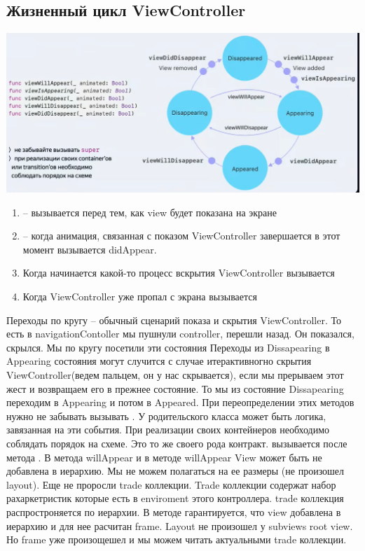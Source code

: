 \documentclass{article}
\begin{document}
    \subsection{Жизненный цикл ViewController}
    \includegraphics[scale = 0.4]{pic/Снимок экрана 2023-08-02 в 21.47.17.png}
    \begin{enumerate}
        \item {} -- вызывается перед тем, как view будет показана на экране
        \item {} -- когда анимация, связанная с показом ViewController завершается в этот момент вызывается didAppear.
        \item Когда начинается какой-то процесс вскрытия ViewController вызывается 
        \item Когда ViewController уже пропал с экрана вызывается 
    \end{enumerate}
    Переходы по кругу -- обычный сценарий показа и скрытия ViewController. То есть в navigationContoller мы пушнули controller, перешли назад. Он показался, скрылся. Мы по кругу посетили эти состояния
    \newline
    \newline
    Переходы из Dissapearing в Appearing состояния могут случится с случае итерактивногно скрытия ViewController(ведем пальцем, он у нас скрывается), если мы прерываем этот жест и возвращаем его в прежнее состояние. То мы из состояние Dissapearing переходим в Appearing и потом в Appeared. 
    \newline
    При переопределении этих методов нужно не забывать вызывать . У родительского класса может быть логика, завязанная на эти события. 
    \newline
    При реализации своих контейнеров необходимо соблядать порядок на схеме. Это то же своего рода контракт. 
    \newline
     вызывается после метода . В метода willAppear и в методе willAppear View может быть не добавлена в иерархию. Мы не можем полагаться на ее размеры (не произошел layout). Еще не проросли trade коллекции. Trade коллекции содержат набор рахаркетристик которые есть в enviroment этого контроллера. trade коллекция распростроняется по иерархии. 
    \newline
    В методе  гарантируется, что view добавлена в иерархию и для нее расчитан frame. Layout не произошел у subviews root view. Но frame уже произощешел и мы можем читать актуальными trade коллекции.
\end{document}
